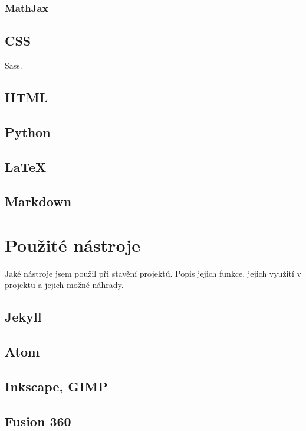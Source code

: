 \documentclass[a4paper, 12pt]{article}
\begin{document}
  \subsubsection{MathJax}

  \subsection{CSS}
  Sass.

  \subsection{HTML}

  \subsection{Python}

  \subsection{\LaTeX{}}

  \subsection{Markdown}


  \section{Použité nástroje}
  Jaké nástroje jsem použil při stavění projektů.
  Popis jejich funkce, jejich využití v projektu a jejich možné náhrady.

  \subsection{Jekyll}

  \subsection{Atom}

  \subsection{Inkscape, GIMP}

  \subsection{Fusion 360}
\end{document}
